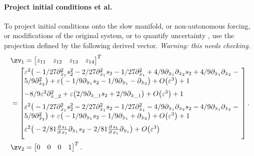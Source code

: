 \paragraph{Project initial conditions et al.}
To project initial conditions onto the slow manifold, or
non-autonomous forcing, or modifications of the original
system, or to quantify uncertainty \cite[Ch.12]{Roberts89b,
Roberts97b, Roberts2014a}, use the projection defined by the
following derived vector.   \emph{Warning: this needs checking.}
\begin{align*}&
\zv_1=\begin{bmatrix}z_{11}&z_{12}&z_{13}&z_{14}\end{bmatrix}^T
\\&
=\begin{bmatrix}
\ParMath{ 
\eps^{2} \big(-1/27 \diff_{x_1}^{2} s_{2}^{2}-2/27 \diff_{x_1}
^{2} s_{2}-1/27 \diff_{x_1}^{2}+4/9 \diff_{x_1} \diff_{x_2} s_{2}+4/9
 \diff_{x_1} \diff_{x_2}-5/9 \diff_{x_2}^{2}\big)+\eps \big(-1/9 
\diff_{x_1} s_{2}-1/9 \diff_{x_1}-\diff_{x_2}\big)+O\big(\varepsilon 
^{3}\big)+1
}\\\ParMath{
-8/9 \eps^{2} \diff_{x\_2}^{2}+\eps \big(2/9 \diff_{x\_1} s_{2}+2
/9 \diff_{x\_1}\big)+O\big(\varepsilon ^{3}\big)+1 
}\\\ParMath{ 
\eps^{2} \big(-1/27 \diff_{x_1}^{2} s_{2}^{2}-2/27 \diff_{x_1}
^{2} s_{2}-1/27 \diff_{x_1}^{2}-4/9 \diff_{x_1} \diff_{x_2} s_{2}-4/9
 \diff_{x_1} \diff_{x_2}-5/9 \diff_{x_2}^{2}\big)+\eps \big(-1/9 
\diff_{x_1} s_{2}-1/9 \diff_{x_1}+\diff_{x_2}\big)+O\big(\varepsilon 
^{3}\big)+1
}\\\ParMath{ 
\eps^{2} \big(-2/81 \frac{\partial \,s_{1}}{\partial \,x_1} 
\diff_{x_1} s_{2}-2/81 \frac{\partial \,s_{1}}{\partial \,x_1} \diff_{
x_1}\big)+O\big(\varepsilon ^{3}\big)
}\end{bmatrix}.
\\&
\zv_2=\begin{bmatrix}0&0&0&1\end{bmatrix}^T.
\end{align*}


